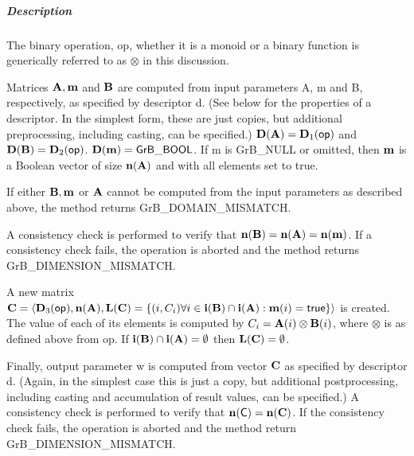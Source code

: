 \subparagraph{Description}


The binary operation, {\sf op}, whether it is a monoid or a binary function
is generically referred to as $\otimes$ in this discussion.

Matrices ${\bf A}, {\bf m}$ and ${\bf B}$ are computed from
input parameters {\sf A}, {\sf m} and {\sf B}, respectively, as specified
by descriptor {\sf d}. (See below for the properties of a descriptor. In
the simplest form, these are just copies, but additional preprocessing,
including casting, can be specified.)  $\bold{D}({\bf A}) =
\bold{D}_1({\sf op})$ and $\bold{D}({\bf B}) = \bold{D}_2({\sf op})$.
$\bold{D}({\bf m}) = {\sf GrB\_BOOL}$.  If {\sf m} is {\sf GrB\_NULL} or omitted,
then ${\bf m}$ is a Boolean vector of size $\bold{n}({\bf A})$
and with all elements set to {\sf true}.

If either ${\bf B}, {\bf m}$ or ${\bf A}$ cannot be computed
from the input parameters as described above, the method returns {\sf
	GrB\_DOMAIN\_MISMATCH}.

A consistency check is performed to verify that $\bold{n}({\bf B})
= \bold{n}({\bf A}) = \bold{n}({\bf m})$. If a consistency
check fails, the operation is aborted and the method returns {\sf
	GrB\_DIMENSION\_MISMATCH}.

A new matrix ${\bf C} = \langle \bold{D}_3({\sf op}),
\bold{n}({\bf A}), \bold{L}({\bf C}) = \{(i,C_i)  \forall i \in
{\bf i}({\bf B}) \cap {\bf i}({\bf A}) : {\bf m}(i)
= {\sf true} \} \rangle$ is created.  The value of each of its
elements is computed by $C_i = {\bf A}(i) \otimes {\bf B}(i)$,
where $\otimes$ is as defined above from {\sf op}.
If ${\bf i}({\bf B}) \cap {\bf i}({\bf A}) = \emptyset$
then $\bold{L}({\bf C}) = \emptyset$.

Finally, output parameter {\sf w} is computed from vector ${\bf C}$
as specified by descriptor {\sf d}. (Again, in the simplest case this
is just a copy, but additional postprocessing, including casting and
accumulation of result values, can be specified.)  A consistency check is
performed to verify that $\bold{n}({\sf C}) = \bold{n}({\bf C})$. If
the consistency check fails, the operation is aborted and the method
return {\sf GrB\_DIMENSION\_MISMATCH}.




